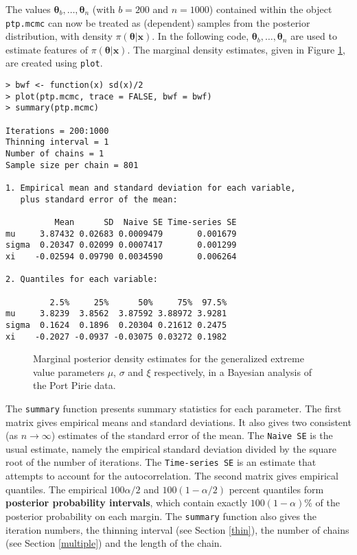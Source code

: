 \documentclass[11pt,a4paper]{article}
\newcommand{\bs}{\boldsymbol}
\begin{document}
The values $\bs{\theta}_b,\dots,\bs{\theta}_n$ (with $b=200$ and
$n=1000$) contained within the object \verb+ptp.mcmc+ can now be
treated as (dependent) samples from the posterior distribution, with
density $\pi(\bs{\theta}|\bs{x})$.  In the following code,
$\bs{\theta}_b,\dots,\bs{\theta}_n$ are used to estimate features of
$\pi(\bs{\theta}|\bs{x})$.  The marginal density estimates, given in
Figure \ref{piriedens}, are created using \verb+plot+.

\begin{verbatim}
> bwf <- function(x) sd(x)/2
> plot(ptp.mcmc, trace = FALSE, bwf = bwf)
> summary(ptp.mcmc)

Iterations = 200:1000
Thinning interval = 1 
Number of chains = 1 
Sample size per chain = 801 

1. Empirical mean and standard deviation for each variable,
   plus standard error of the mean:

          Mean      SD  Naive SE Time-series SE
mu     3.87432 0.02683 0.0009479       0.001679
sigma  0.20347 0.02099 0.0007417       0.001299
xi    -0.02594 0.09790 0.0034590       0.006264

2. Quantiles for each variable:

         2.5%     25%      50%     75%  97.5%
mu     3.8239  3.8562  3.87592 3.88972 3.9281
sigma  0.1624  0.1896  0.20304 0.21612 0.2475
xi    -0.2027 -0.0937 -0.03075 0.03272 0.1982
\end{verbatim}

\begin{figure}
\begin{center}
\vspace{-1.5cm}
\hspace{0cm}
\hspace{0cm}
\end{center}
\caption{Marginal posterior density estimates for the generalized
  extreme value parameters $\mu$, $\sigma$ and $\xi$ respectively, in
  a Bayesian analysis of the Port Pirie data.}
\label{piriedens}
\end{figure}

The \verb+summary+ function presents summary statistics for each
parameter.  The first matrix gives empirical means and standard
deviations.  It also gives two consistent (as $n\rightarrow\infty$)
estimates of the standard error of the mean.  The \verb+Naive SE+ is
the usual estimate, namely the empirical standard deviation divided by
the square root of the number of iterations.  The
\verb+Time-series SE+ is an estimate that attempts to account for the
autocorrelation.  The second matrix gives empirical quantiles.  The
empirical $100\alpha/2$ and $100(1-\alpha/2)$ percent quantiles form
\textbf{posterior probability intervals}, which contain exactly
$100(1-\alpha)\%$ of the posterior probability on each margin.  The
\verb+summary+ function also gives the iteration numbers, the thinning
interval (see Section \ref{thin}), the number of chains (see Section
\ref{multiple}) and the length of the chain.
\end{document}
